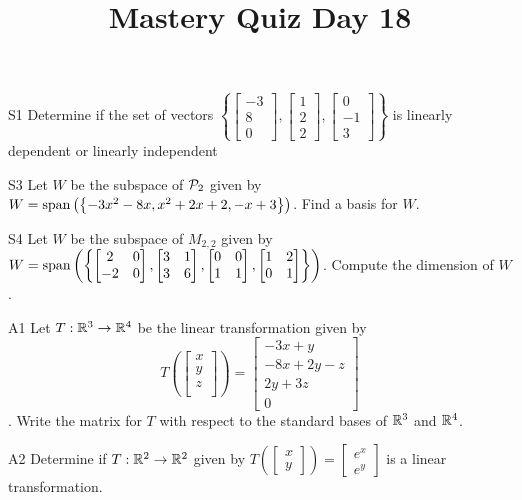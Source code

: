 \documentclass{sbgLAquiz}
\title{Mastery Quiz Day 18 }
\begin{document}
\begin{problem}{S1}
Determine if the set of vectors $\left\{ \begin{bmatrix} -3 \\ 8 \\ 0 \end{bmatrix}, \begin{bmatrix} 1 \\ 2 \\ 2 \end{bmatrix}, \begin{bmatrix} 0 \\ -1 \\ 3 \end{bmatrix} \right\}$ is  linearly dependent or linearly independent
\end{problem}

\begin{problem}{S3}
Let $W$ be the subspace of $\P_2$ given by $W = {\rm span} \left( \left\{  -3x^2-8x, x^2+2x+2, -x+3\right\} \right)$.   Find a basis for $W$.
\end{problem}
\newpage

\begin{problem}{S4}
Let $W$ be the subspace of $M_{2,2}$ given by $W={\rm span}\left(\left\{\begin{bmatrix} 2 & 0 \\ -2 & 0 \end{bmatrix}, \begin{bmatrix} 3 & 1 \\ 3 & 6 \end{bmatrix}, \begin{bmatrix} 0 & 0 \\ 1 & 1 \end{bmatrix}, \begin{bmatrix}1 & 2 \\ 0 & 1 \end{bmatrix}\right\}\right)$. Compute the dimension of $W$.
\end{problem}

\begin{problem}{A1}
Let $T: \IR^3\rightarrow \IR^4$ be the linear transformation given by $$T\left(\begin{bmatrix} x \\ y \\ z \\  \end{bmatrix} \right) = \begin{bmatrix} -3x+y \\ -8x+2y-z \\ 2y+3z \\ 0 \end{bmatrix}$$.  Write the matrix for $T$ with respect to the standard bases of $\IR^3$ and $\IR^4$.
\end{problem}
\newpage

\begin{problem}{A2}
 Determine if $T: \IR^2 \rightarrow \IR^2$ given by $T\left(\begin{bmatrix} x \\ y \end{bmatrix}\right) = \begin{bmatrix} e^{x} \\ e^y \end{bmatrix}$ is a linear transformation.
\end{problem}
\end{document}
